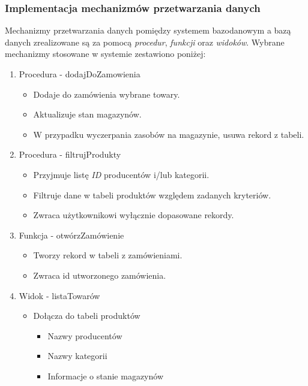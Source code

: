 \documentclass[a4paper, 12pt]{article}
\newcommand{\snippet}[2]{



}
\begin{document}
\snippet{SQL}{triggery.sql}

\subsubsection{Implementacja mechanizmów przetwarzania danych}
Mechanizmy przetwarzania danych pomiędzy systemem bazodanowym a bazą danych zrealizowane są za pomocą \textit{procedur}, \textit{funkcji} oraz \textit{widoków}. Wybrane mechanizmy stosowane w systemie zestawiono poniżej:

\begin{enumerate}
\item Procedura - dodajDoZamowienia
\begin{itemize}
\item Dodaje do zamówienia wybrane towary.
\item Aktualizuje stan magazynów.
\item W przypadku wyczerpania zasobów na magazynie, usuwa rekord z tabeli.

\snippet{SQL}{procedura.sql}

\end{itemize}
\item Procedura - filtrujProdukty
\begin{itemize}
\item Przyjmuje listę \textit{ID} producentów i/lub kategorii.
\item Filtruje dane w tabeli produktów względem zadanych kryteriów.
\item Zwraca użytkownikowi wyłącznie dopasowane rekordy.
\end{itemize}
\item Funkcja - otwórzZamówienie
\begin{itemize}
\item Tworzy rekord w tabeli z zamówieniami.
\item Zwraca id utworzonego zamówienia.


\end{itemize}
\item Widok - listaTowarów
\begin{itemize}
\item Dołącza do tabeli produktów
\begin{itemize}
\item Nazwy producentów
\item Nazwy kategorii
\item Informacje o stanie magazynów
\end{itemize}
\end{itemize}
\end{enumerate}
\end{document}
